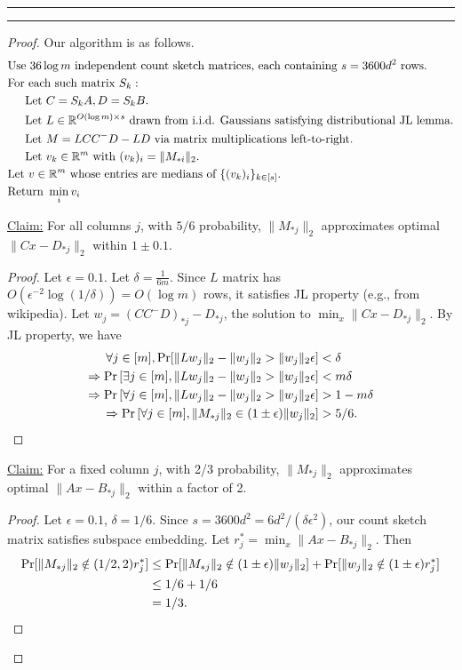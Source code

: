 \documentclass[11pt]{article}
\newcommand{\question}[1] {\vspace{.3in} \hrule\vspace{0.3em}
\noindent{\bf #1} \vspace{0.7em}
\hrule \vspace{.10in}}
\begin{document}
\newpage
\question{Task 4}
\begin{proof}
Our algorithm is as follows.
\begin{align*}
&\text{Use }36\log m\text{ independent count sketch matrices, each containing }s = 3600d^2 \text{ rows}.\\
&\text{For each such matrix }S_k:\\
&\hspace{15px}\text{Let }C = S_kA, D = S_kB.\\
&\hspace{15px}\text{Let }L \in \mathbb{R}^{O(\log m) \times s}\text{ drawn from i.i.d. Gaussians satisfying distributional JL lemma.}\\
&\hspace{15px}\text{Let }M = LCC^-D - LD \text{ via matrix multiplications left-to-right.}\\
&\hspace{15px}\text{Let }v_k \in \mathbb{R}^m \text{ with }(v_k)_i = \|M_{*i}\|_2.\\
&\text{Let }v \in \mathbb{R}^m \text{ whose entries are medians of }\{(v_k)_i\}_{k \in [s]}.\\
&\text{Return }\min_i v_i
\end{align*}

\underline{Claim:} For all columns $j$, with $5/6$ probability, $\|M_{*j}\|_2$ approximates optimal $\|Cx - D_{*j}\|_2$ within $1 \pm 0.1$.
\begin{proof}
Let $\epsilon = 0.1$. Let $\delta = \frac{1}{6m}$. Since $L$ matrix has $O(\epsilon^{-2}\log(1/\delta)) = O(\log m)$ rows, it satisfies JL property (e.g., from wikipedia). Let $w_j = (CC^-D)_{*j} - D_{*j}$, the solution to $\min_x \|Cx - D_{*j}\|_2$. By JL property, we have
\begin{align*}
    \forall j \in [m], \Pr[\|Lw_j\|_2 - \|w_j\|_2 > \|w_j\|_2\epsilon] &< \delta\\
    \Rightarrow \Pr\left[\exists j \in [m], \|Lw_j\|_2 - \|w_j\|_2 > \|w_j\|_2\epsilon\right] &< m\delta\\
    \Rightarrow \Pr\left[\forall j \in [m], \|Lw_j\|_2 - \|w_j\|_2 > \|w_j\|_2\epsilon\right] &> 1 - m\delta\\
    \Rightarrow \Pr\left[\forall j \in [m], \|M_{*j}\|_2 \in (1 \pm \epsilon) \|w_j\|_2\right] &> 5/6. \qedhere
\end{align*}
\end{proof}

\underline{Claim:} For a fixed column $j$, with 2/3 probability, $\|M_{*j}\|_2$ approximates optimal $\|Ax - B_{*j}\|_2$ within a factor of 2.
\begin{proof}
Let $\epsilon = 0.1$, $\delta = 1/6$. Since $s = 3600d^2 = 6d^2/(\delta \epsilon^2)$, our count sketch matrix satisfies subspace embedding. Let $r_j^* = \min_x\|Ax - B_{*j}\|_2$. Then
\begin{align*}
    \Pr[\|M_{*j}\|_2 \notin (1/2, 2)r_j^*] &\le \Pr[\|M_{*j}\|_2 \notin (1 \pm \epsilon)\|w_j\|_2] + \Pr[\|w_j\|_2 \notin (1 \pm \epsilon)r_j^*]\\
    &\le 1/6 + 1/6\\
    &= 1/3. \qedhere
\end{align*}
\end{proof}


\end{proof}
\end{document}
